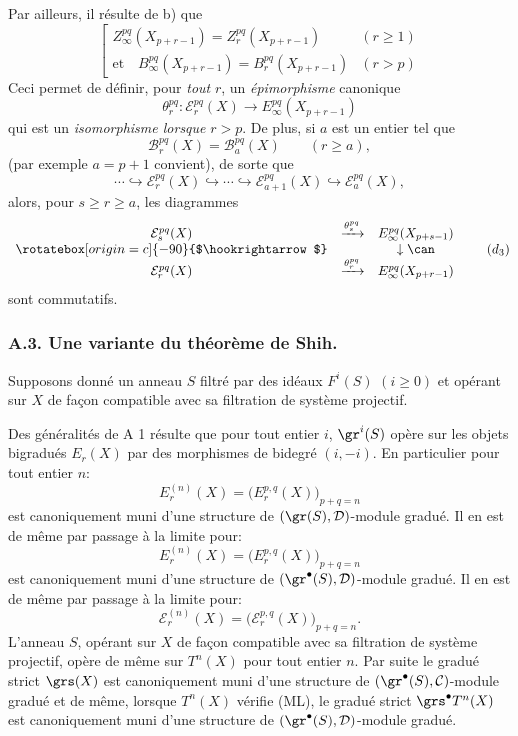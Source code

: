 Par ailleurs, il résulte de b) que
\begin{equation}
\left[
\begin{array}{ll}
Z_\infty^{pq}(X_{p+r-1})=Z_r^{pq}(X_{p+r-1})&(r\ge1)\\[3pt]
\text{et}\quad B_\infty^{pq}(X_{p+r-1})=B_r^{pq}(X_{p+r-1})&(r>p)
\end{array}
\right.
\tag{\(d_2\)}
\end{equation}
Ceci permet de définir, pour \emph{tout} \(r\), un \emph{épimorphisme} canonique
\[
\theta_r^{pq}:\mathcal{E}_r^{pq}(X)\longrightarrow E_\infty^{pq}(X_{p+r-1})
\]
qui est un \emph{isomorphisme lorsque} \(r>p\). De plus, si \(a\) est un entier tel que
\[
\mathcal{B}_r^{pq}(X)=\mathcal{B}_a^{pq}(X)\qquad(r\ge a),
\]
(par exemple \(a=p+1\) convient), de sorte que
\begin{equation}
\cdots\hookrightarrow\mathcal{E}_r^{pq}(X)\hookrightarrow\cdots\hookrightarrow
\mathcal{E}_{a+1}^{pq}(X)\hookrightarrow\mathcal{E}_a^{pq}(X),
\tag{S bis}
\end{equation}
alors, pour \(s\ge r\ge a\), les diagrammes
\begin{equation}
\begin{array}{ccc}
\mathcal{E}_s^{pq}(X)&\xrightarrow{\theta_s^{pq}}&E_\infty^{pq}(X_{p+s-1})\\
\rotatebox[origin=c]{-90}{$\hookrightarrow$}&&\downarrow\can\\
\mathcal{E}_r^{pq}(X)&\xrightarrow{\theta_r^{pq}}&E_\infty^{pq}(X_{p+r-1})
\end{array}
\tag{\(d_3\)}
\end{equation}
sont commutatifs.

\subsubsection*{A.3. Une variante du théorème de Shih.}
Supposons donné un anneau \(S\) filtré par des idéaux \(F^i(S)\) \((i\ge0)\) et opérant sur \(X\) de façon compatible avec sa filtration de système projectif.

Des généralités de A 1 résulte que pour tout entier \(i\), \(\gr^i(S)\) opère sur les objets bigradués \(E_r(X)\) par des morphismes de bidegré \((i,-i)\). En particulier pour tout entier \(n\):
\[
E_r^{(n)}(X)=\bigl(E_r^{p,q}(X)\bigr)_{p+q=n}
\]
est canoniquement muni d'une structure de \((\gr(S),\mathcal{D})\)-module gradué. Il en est de même par passage à la limite pour:
\[
E^{(n)}_r(X)=\bigl(E_r^{p,q}(X)\bigr)_{p+q=n}
\]
est canoniquement muni d'une structure de \((\gr^\bullet(S),\mathcal{D})\)-module gradué. Il en est de même par passage à la limite pour:
\[
\mathcal{E}_r^{(n)}(X)=\bigl(\mathcal{E}_r^{p,q}(X)\bigr)_{p+q=n}.
\]
L'anneau \(S\), opérant sur \(X\) de façon compatible avec sa filtration de système projectif, opère de même sur \(T^n(X)\) pour tout entier \(n\). Par suite le gradué strict \(\grs(X)\) est
canoniquement muni d'une structure de \((\gr^\bullet(S),\mathcal{C})\)-module gradué et de même, lorsque \(T^n(X)\) vérifie (ML), le gradué strict \(\grs^\bullet T^n(X)\) est canoniquement muni d'une structure de \((\gr^\bullet(S),\mathcal{D})\)-module gradué.

